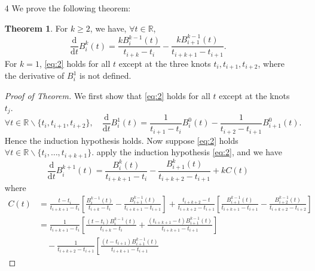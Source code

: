 \documentclass[a4paper]{book}
\makeatletter
\newcommand{\dif}{\mathrm{d}}
\newenvironment{sol}[1][\solname]{\par
  \pushQED{\qed}
  \normalfont \topsep6\p@\@plus6\p@\relax
  \trivlist
  \item[\hskip\labelsep
        \itshape
    #1\@addpunct{.}]\ignorespaces
}{\popQED\endtrivlist\@endpefalse}
\providecommand{\solname}{Solution}
\numberwithin{equation}{chapter}
\theoremstyle{definition}
\newtheorem{thm}{Theorem}[chapter]
\makeatother
\begin{document}
\begin{sol}
\begin{itemize}
          \item [4]  We prove the following theorem:
          \begin{thm}
            For $k\ge 2$, we have,
            $\forall t\in\mathbb{R}$,
            \begin{equation}
              \label{eq:2}
              \frac{\dif}{\dif t}B_i^k(t) = \frac{kB_i^{k-1}(t)}{t_{i+k}-t_i} -
              \frac{kB_{i+1}^{k-1}(t)}{t_{i+k+1}-t_{i+1}}.
            \end{equation}
            For $k=1$, \eqref{eq:2} holds for all $t$ except at the three knots
            $t_i, t_{i+1}, t_{i+2}$,
            where the derivative of $B_i^1$ is not defined.
          \end{thm}
          \begin{proof}[Proof of Theorem]
            We first show that \eqref{eq:2} holds for all $t$ except at the knots $t_j$.
            \begin{displaymath}
              \forall t\in\mathbb{R}\backslash\{t_i, t_{i+1}, t_{i+2}\},\quad
              \frac{\dif}{\dif t}B_i^1(t) = \frac{1}{t_{i+1}-t_i}B_i^0(t)
              - \frac{1}{t_{i+2}-t_{i+1}}B_{i+1}^0(t).
            \end{displaymath}
            Hence the induction hypothesis holds.
            Now suppose \eqref{eq:2} holds $\forall t\in\mathbb{R}\backslash
            \{t_i, \ldots, t_{i+k+1}\}$.
            apply the induction hypothesis \eqref{eq:2},
            and we have
            \begin{equation}
              \label{eq:3}
              \frac{\dif}{\dif t}B_i^{k+1}(t) = \frac{B_i^k(t)}{t_{i+k+1}-t_i} -
      \frac{B_{i+1}^k(t)}{t_{i+k+2}-t_{i+1}} + kC(t)
      \end{equation}
      where
      \begin{align*}
        C(t) &= \frac{t-t_i}{t_{i+k+1}-t_i}\left[\frac{B_i^{k-1}(t)}{t_{i+k}-t_i}
        - \frac{B_{i+1}^{k-1}(t)}{t_{i+k+1}-t_{i+1}}\right] +
        \frac{t_{i+k+2}-t}{t_{i+k+2}-t_{i+1}}\left[\frac{B_{i+1}^{k-1}(t)}{t_{i+k+1}-t_{i+1}}
               - \frac{B_{i+2}^{k-1}(t)}{t_{i+k+2}-t_{i+2}}\right] \\
             &=
               \frac{1}{t_{i+k+1}-t_i}\left[\frac{(t-t_i)B_i^{k-1}(t)}{t_{i+k}-t_i}
                 +
                 \frac{(t_{i+k+1}-t)B_{i+1}^{k-1}(t)}{t_{i+k+1}-t_{i+1}}\right] \\
               &\quad- \frac{1}{t_{i+k+2}-t_{i+1}}\left[\frac{(t-t_{i+1})B_{i+1}^{k-1}(t)}{t_{i+k+1}-t_{i+1}}

\end{align*}
\end{proof}
\end{itemize}
\end{sol}
\end{document}
